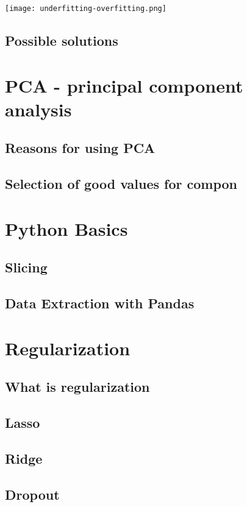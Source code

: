 \texttt{[image: underfitting-overfitting.png]}

\subsection{Possible solutions}

\section{PCA - principal component analysis}

\subsection{Reasons for using PCA}
\subsection{Selection of good values for compon}

\section{Python Basics}

\subsection{Slicing}
\subsection{Data Extraction with Pandas}

\section{Regularization}
\subsection{What is regularization}
\subsection{Lasso}
\subsection{Ridge}
\subsection{Dropout}

